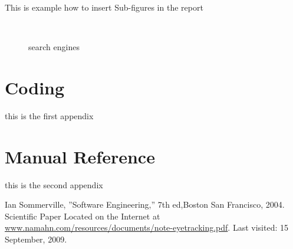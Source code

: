 \documentclass{report}
\begin{document}
This is example how to insert Sub-figures in the report
\begin{figure}
  \centering
  ~~~~
  \caption{search engines}
  \label{fig:SE}
\end{figure}
\appendix
\chapter{Coding}
this is the first appendix
\chapter{Manual Reference}
this is the second appendix
\renewcommand\bibname{Refrences}
\begin{thebibliography}{}
Ian Sommerville, ”Software Engineering,” 7th ed,Boston San Francisco, 2004.
Scientific Paper Located on the Internet at \href{www.namahn.com/resources/documents/note-eyetracking.pdf}{www.namahn.com/resources/documents/note-eyetracking.pdf}. Last visited: 15 September, 2009.
\end{thebibliography}
\end{document}
